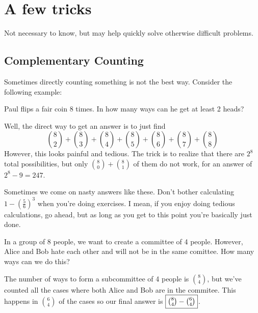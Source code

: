\documentclass{scrartcl}
\begin{document}
	\section{A few tricks}
	Not necessary to know, but may help quickly solve otherwise difficult problems.

	\subsection{Complementary Counting}
	Sometimes directly counting something is not the best way. Consider the following example:
	\begin{example}
		Paul flips a fair coin 8 times. In how many ways can he get at least 2 heads?
	\end{example}
	\begin{soln}
Well, the direct way to get an answer is to just find
\[\binom{8}{2}+\binom{8}{3}+\binom{8}{4}+\binom{8}{5}+\binom{8}{6}+\binom{8}{7}+\binom{8}{8}\]
However, this looks painful and tedious. The trick is to realize that there are $2^8$ total possibilities, but only $\binom{8}{0} + \binom{8}{1}$ of them do not work, for an answer of $2^8 - 9 = \boxed{247}$.
	\end{soln}

Sometimes we come on nasty answers like these. Don't bother calculating $1 - {\left(\frac{5}{6}\right)}^3$ when you're doing exercises. I mean, if you enjoy doing tedious calculations, go ahead, but as long as you get to this point you're basically just done.
	\begin{example}
		In a group of 8 people, we want to create a committee of 4 people. However, Alice and Bob hate each other and will not be in the same comittee. How many ways can we do this?
	\end{example}
	\begin{soln}
		The number of ways to form a subcommittee of 4 people is $\binom{8}{4}$, but we've counted all the cases where both Alice and Bob are in the commitee. This happens in $\binom{6}{4}$ of the cases so our final answer is $\boxed{\tbinom{8}{4} - \tbinom{6}{4}}$.
	\end{soln}
\end{document}
